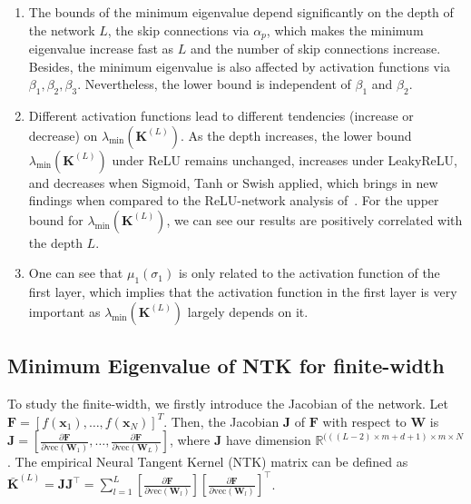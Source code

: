 \documentclass[nohyperref]{article}
\theoremstyle{plain}
\theoremstyle{definition}
\theoremstyle{remark}
\begin{document}
\begin{enumerate}[leftmargin=3.3mm]
    \itemsep-0.2em 
    \item The bounds of the minimum eigenvalue depend significantly on the depth of the network $L$, the skip connections via $\alpha_p$, which makes the minimum eigenvalue increase fast as $L$ and the number of skip connections increase. Besides, the minimum eigenvalue is also affected by activation functions via $\beta_1, \beta_2, \beta_3$. Nevertheless, the lower bound is independent of $\beta_1$ and $\beta_2$. 
    \item Different activation functions lead to different tendencies (increase or decrease) on $\lambda_{\min} (\bm{K}^{(L)})$. As the depth increases, the lower bound $\lambda_{\min} (\bm{K}^{(L)})$ under ReLU remains unchanged, increases under LeakyReLU, and decreases when Sigmoid, Tanh or Swish applied, which brings in new findings when compared to the ReLU-network analysis of~\citet{pmlr-v139-nguyen21g}. For the upper bound for $\lambda_{\min} (\bm{K}^{(L)})$, we can see our results are positively correlated with the depth $L$. 
    \item One can see that $\mu_1(\sigma_1)$ is only related to the activation function of the first layer, which implies that the activation function in the first layer is very important as $\lambda_{\min} (\bm{K}^{(L)})$ largely depends on it.
\end{enumerate}

\subsection{Minimum Eigenvalue of NTK for finite-width}
\label{ssec:Minimum_eigenvalue_NTK_finite}
To study the finite-width, we firstly introduce the Jacobian of the network. Let $\bm{F}=[f(\bm{x}_1) ,\ldots,f(\bm{x}_N)]^T$. Then, the Jacobian $\bm{J}$ of $\bm{F}$ with respect to $\bm{W}$ is $\bm{J} =\left[\frac{\partial \bm{F}}{\partial\text{vec}(\bm{W}_1)},\ldots,\frac{\partial \bm{F}}{\partial\text{vec}(\bm{W}_L)}\right]$,
where $\bm{J}$ have dimension $\mathbb{R}^{(((L-2)\times m+d+1)\times m\times N}$.
The empirical Neural Tangent Kernel (NTK) matrix can be defined as $\bar{\bm{K}}^{(L)} =\bm{JJ}^{\top} =\sum_{l=1}^{L} \left[\frac{\partial \bm{F}}{\partial\text{vec}(\bm{W}_l)}\right] \left[\frac{\partial \bm{F}}{\partial\text{vec}(\bm{W}_l)}\right]^{\top}$.
\end{document}
